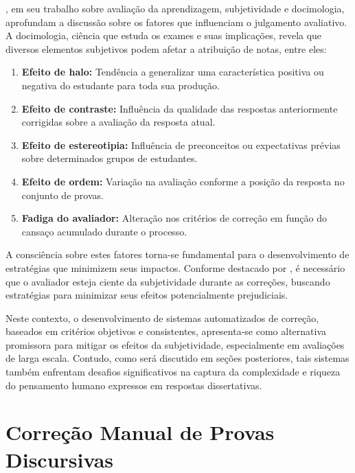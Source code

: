 , em seu trabalho sobre avaliação da aprendizagem, subjetividade e docimologia, aprofundam a discussão sobre os fatores que influenciam o julgamento avaliativo. A docimologia, ciência que estuda os exames e suas implicações, revela que diversos elementos subjetivos podem afetar a atribuição de notas, entre eles:

\begin{enumerate}
    \item \textbf{Efeito de halo:} Tendência a generalizar uma característica positiva ou negativa do estudante para toda sua produção.

    \item \textbf{Efeito de contraste:} Influência da qualidade das respostas anteriormente corrigidas sobre a avaliação da resposta atual.

    \item \textbf{Efeito de estereotipia:} Influência de preconceitos ou expectativas prévias sobre determinados grupos de estudantes.

    \item \textbf{Efeito de ordem:} Variação na avaliação conforme a posição da resposta no conjunto de provas.

    \item \textbf{Fadiga do avaliador:} Alteração nos critérios de correção em função do cansaço acumulado durante o processo.
\end{enumerate}

A consciência sobre estes fatores torna-se fundamental para o desenvolvimento de estratégias que minimizem seus impactos. Conforme destacado por , é necessário que o avaliador esteja ciente da subjetividade durante as correções, buscando estratégias para minimizar seus efeitos potencialmente prejudiciais.

Neste contexto, o desenvolvimento de sistemas automatizados de correção, baseados em critérios objetivos e consistentes, apresenta-se como alternativa promissora para mitigar os efeitos da subjetividade, especialmente em avaliações de larga escala. Contudo, como será discutido em seções posteriores, tais sistemas também enfrentam desafios significativos na captura da complexidade e riqueza do pensamento humano expressos em respostas dissertativas.

\section{Correção Manual de Provas Discursivas}
\label{sec:correcao-manual}

